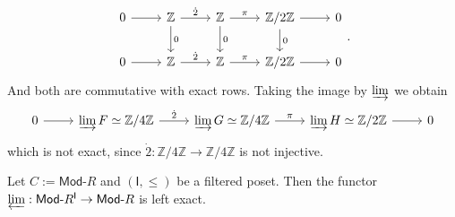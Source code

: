 \begin{rem}
\begin{equation}
	\end{equation} 
	\begin{equation}
	\begin{tikzcd}
		0 \arrow[r, "", rightarrow] &
		\Z \arrow[r, "\dot{2}", rightarrow] \arrow[d, "0", rightarrow] &
		\Z \arrow[r, "\pi", rightarrow] \arrow[d, "0", rightarrow] &
		\mathbb{Z}/2\mathbb{Z} \arrow[r, "", rightarrow] \arrow[d, "0", rightarrow] &
		0 \\
		0 \arrow[r, "", rightarrow] &
		\Z \arrow[r, "\dot{2}", rightarrow]&
		\Z \arrow[r, "\pi", rightarrow] &
		\mathbb{Z}/2\mathbb{Z} \arrow[r, "", rightarrow] &
		0
	\end{tikzcd}
	.\end{equation}
	And both are commutative with exact rows.
	Taking the image by $\varinjlim$ we obtain
	\begin{equation}
	\begin{tikzcd}
		0 \arrow[r, "", rightarrow] &
		\varinjlim F \simeq \mathbb{Z}/4\mathbb{Z} \arrow[r, "\dot{2}", rightarrow] &
		\varinjlim G \simeq \mathbb{Z}/4\mathbb{Z} \arrow[r, "\pi", rightarrow] &
		\varinjlim H \simeq \mathbb{Z}/2\mathbb{Z} \arrow[r, "", rightarrow] &
		0
	\end{tikzcd}
	\end{equation} 
	which is not exact, since $\dot{2}: \mathbb{Z}/4\mathbb{Z} \to \mathbb{Z}/4\mathbb{Z}$ is not injective.
\end{rem}

\begin{prop}
	Let $C := \mathsf{Mod}\text{-}R$ and $\left(\mathsf{I}, \leq\right)$ be a filtered poset.
	Then the functor $\varprojlim: \mathsf{Mod}\text{-}R^{\mathsf{I}} \to \mathsf{Mod}\text{-}R$ is left exact.
\end{prop} 

